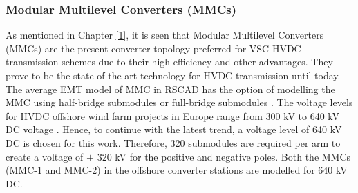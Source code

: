 



\subsubsection{Modular Multilevel Converters (MMCs)}
As mentioned in Chapter \ref{1}, it is seen that Modular Multilevel Converters (\gls{MMC}s) are the present converter topology preferred for \gls{VSC}-\gls{HVDC} transmission schemes due to their high efficiency and other advantages. They prove to be the state-of-the-art technology for \gls{HVDC} transmission until today. The average \gls{EMT} model of \gls{MMC} in
RSCAD has the option of modelling the \gls{MMC} using half-bridge submodules or full-bridge submodules \cite{noauthor_mmc_nodate_1}. 
The voltage levels for \gls{HVDC} offshore wind farm projects in Europe range from 300 kV to 640 kV \gls{DC} voltage \cite{ryndzionek_evolution_2020}. Hence, to continue with the latest trend, a voltage level of 640 kV \gls{DC} is chosen for this work. Therefore, 320 submodules are required per arm to create a voltage of $\pm$ 320 kV for the positive and negative poles. Both the \gls{MMC}s (\gls{MMC}-1 and \gls{MMC}-2) in the offshore converter stations are modelled for 640 kV \gls{DC}.  




